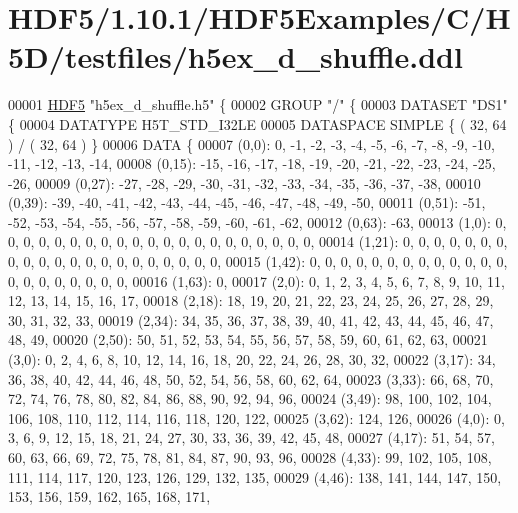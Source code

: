 \hypertarget{_h_d_f5_21_810_81_2_h_d_f5_examples_2_c_2_h5_d_2testfiles_2h5ex__d__shuffle_8ddl_source}{}\section{H\+D\+F5/1.10.1/\+H\+D\+F5\+Examples/\+C/\+H5\+D/testfiles/h5ex\+\_\+d\+\_\+shuffle.ddl}
\label{_h_d_f5_21_810_81_2_h_d_f5_examples_2_c_2_h5_d_2testfiles_2h5ex__d__shuffle_8ddl_source}

\begin{DoxyCode}
00001 \hyperlink{namespace_h_d_f5}{HDF5} \textcolor{stringliteral}{"h5ex\_d\_shuffle.h5"} \{
00002 GROUP \textcolor{stringliteral}{"/"} \{
00003    DATASET \textcolor{stringliteral}{"DS1"} \{
00004       DATATYPE  H5T\_STD\_I32LE
00005       DATASPACE  SIMPLE \{ ( 32, 64 ) / ( 32, 64 ) \}
00006       DATA \{
00007       (0,0): 0, -1, -2, -3, -4, -5, -6, -7, -8, -9, -10, -11, -12, -13, -14,
00008       (0,15): -15, -16, -17, -18, -19, -20, -21, -22, -23, -24, -25, -26,
00009       (0,27): -27, -28, -29, -30, -31, -32, -33, -34, -35, -36, -37, -38,
00010       (0,39): -39, -40, -41, -42, -43, -44, -45, -46, -47, -48, -49, -50,
00011       (0,51): -51, -52, -53, -54, -55, -56, -57, -58, -59, -60, -61, -62,
00012       (0,63): -63,
00013       (1,0): 0, 0, 0, 0, 0, 0, 0, 0, 0, 0, 0, 0, 0, 0, 0, 0, 0, 0, 0, 0, 0,
00014       (1,21): 0, 0, 0, 0, 0, 0, 0, 0, 0, 0, 0, 0, 0, 0, 0, 0, 0, 0, 0, 0, 0,
00015       (1,42): 0, 0, 0, 0, 0, 0, 0, 0, 0, 0, 0, 0, 0, 0, 0, 0, 0, 0, 0, 0, 0,
00016       (1,63): 0,
00017       (2,0): 0, 1, 2, 3, 4, 5, 6, 7, 8, 9, 10, 11, 12, 13, 14, 15, 16, 17,
00018       (2,18): 18, 19, 20, 21, 22, 23, 24, 25, 26, 27, 28, 29, 30, 31, 32, 33,
00019       (2,34): 34, 35, 36, 37, 38, 39, 40, 41, 42, 43, 44, 45, 46, 47, 48, 49,
00020       (2,50): 50, 51, 52, 53, 54, 55, 56, 57, 58, 59, 60, 61, 62, 63,
00021       (3,0): 0, 2, 4, 6, 8, 10, 12, 14, 16, 18, 20, 22, 24, 26, 28, 30, 32,
00022       (3,17): 34, 36, 38, 40, 42, 44, 46, 48, 50, 52, 54, 56, 58, 60, 62, 64,
00023       (3,33): 66, 68, 70, 72, 74, 76, 78, 80, 82, 84, 86, 88, 90, 92, 94, 96,
00024       (3,49): 98, 100, 102, 104, 106, 108, 110, 112, 114, 116, 118, 120, 122,
00025       (3,62): 124, 126,
00026       (4,0): 0, 3, 6, 9, 12, 15, 18, 21, 24, 27, 30, 33, 36, 39, 42, 45, 48,
00027       (4,17): 51, 54, 57, 60, 63, 66, 69, 72, 75, 78, 81, 84, 87, 90, 93, 96,
00028       (4,33): 99, 102, 105, 108, 111, 114, 117, 120, 123, 126, 129, 132, 135,
00029       (4,46): 138, 141, 144, 147, 150, 153, 156, 159, 162, 165, 168, 171,

\end{DoxyCode}

